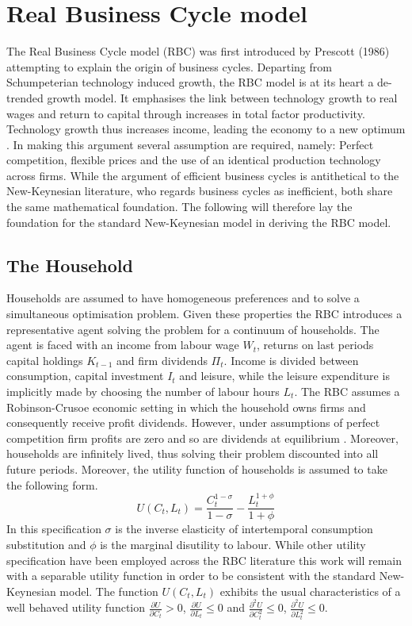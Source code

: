 \documentclass[12pt,a4paper,english]{article} %
\let\oldsection\section
\renewcommand\section{\clearpage\oldsection}
\begin{document}
	\section{Real Business Cycle model}
	The Real Business Cycle model (RBC) was first introduced by Prescott (1986) \cite{prescott_theory_1986} attempting to explain the origin of business cycles. Departing from Schumpeterian technology induced growth, the RBC model is at its heart a de-trended growth model. It emphasises the link between technology growth to real wages and return to capital through increases in total factor productivity. Technology growth thus increases income, leading the economy to a new optimum \cite{prescott_theory_1986}. 
	In making this argument several assumption are required, namely: Perfect competition, flexible prices and the use of an identical production technology across firms. While the argument of efficient business cycles is antithetical to the New-Keynesian literature, who regards business cycles as inefficient, both share the same mathematical foundation. The following will therefore lay the foundation for the standard New-Keynesian model in deriving the RBC model.
	
	\subsection{The Household}
	Households are assumed to have homogeneous preferences and to solve a simultaneous optimisation problem. Given these properties the RBC introduces a representative agent solving the problem for a continuum of households.
	The agent is faced with an income from labour wage $W_t$, returns on last periods capital holdings $K_{t-1}$ and firm dividends $\Pi_t$. Income is divided between consumption, capital investment $I_t$ and leisure, while the leisure expenditure is implicitly made by choosing the number of labour hours $L_t$. The RBC assumes a Robinson-Crusoe economic setting in which the household owns firms and consequently receive profit dividends. However, under assumptions of perfect competition firm profits are zero and so are dividends at equilibrium \cite{prescott_theory_1986}. 
	Moreover, households are infinitely lived, thus solving their problem discounted into all future periods. Moreover, the utility function of households is assumed to take the following form.
	\begin{equation}
		U(C_t, L_t) = \frac{C_t^{1-\sigma}}{{1-\sigma}} - \frac{L_t^{1+\phi}}{1+\phi} 
	\end{equation}
	In this specification $\sigma$ is the inverse elasticity of intertemporal consumption substitution and $\phi$ is the marginal disutility to labour. While other utility specification have been employed across the RBC literature this work will remain with a separable utility function in order to be consistent with the standard New-Keynesian model. The function $U(C_t, L_t)$ exhibits the usual characteristics of a well behaved utility function $\frac{\partial U}{\partial C_t} > 0$, $\frac{\partial U}{\partial L_t} \leq 0$ and $\frac{\partial^2 U}{\partial C_t^2} \leq 0$, $\frac{\partial^2 U}{\partial L_t^2} \leq 0$.
	
\end{document}
